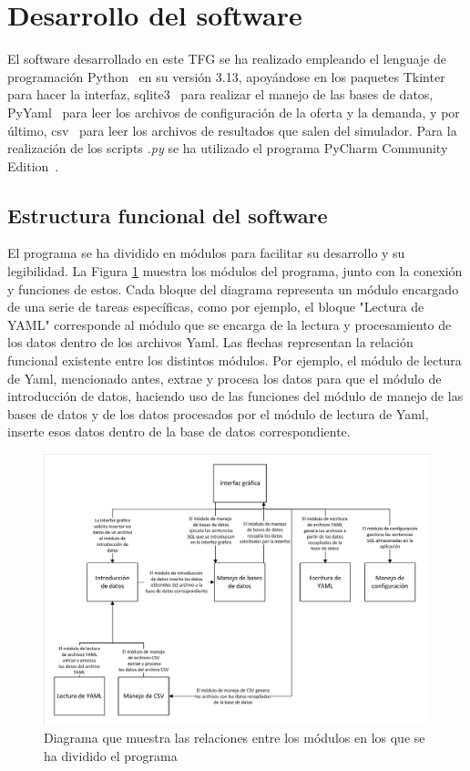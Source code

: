 \section{Desarrollo del software}
\label{sec:desarrolloSoftware}

El software desarrollado en este \acrshort{TFG} se ha realizado empleando el lenguaje de programación Python~\cite{Python} en su versión 3.13, apoyándose en los paquetes Tkinter~\cite{Tkinter} para hacer la interfaz, sqlite3~\cite{Python_SQLite3} para realizar el manejo de las bases de datos, PyYaml~\cite{PyYaml} para leer los archivos de configuración de la oferta y la demanda, y por último, csv~\cite{Python_CSV} para leer los archivos de resultados que salen del simulador. Para la realización de los scripts \textit{.py} se ha utilizado el programa PyCharm Community Edition~\cite{PyCharm}.

\subsection{Estructura funcional del software}

El programa se ha dividido en módulos para facilitar su desarrollo y su legibilidad. La Figura \ref{fig:DiagramaModulosPrograma} muestra los módulos del programa, junto con la conexión y funciones de estos. Cada bloque del diagrama representa un módulo encargado de una serie de tareas específicas, como por ejemplo, el bloque "Lectura de YAML" corresponde al módulo que se encarga de la lectura y procesamiento de los datos dentro de los archivos \acrshort{Yaml}. Las flechas representan la relación funcional existente entre los distintos módulos. Por ejemplo, el módulo de lectura de \acrshort{Yaml}, mencionado antes, extrae y procesa los datos para que el módulo de introducción de datos, haciendo uso de las funciones del módulo de manejo de las bases de datos y de los datos procesados por el módulo de lectura de \acrshort{Yaml}, inserte esos datos dentro de la base de datos correspondiente.

\begin{figure}[H]
\centering
\includegraphics[width=1\textwidth]{fig/Diagramas/Modulos de programa.pdf}
\caption{Diagrama que muestra las relaciones entre los módulos en los que se ha dividido el programa}
\label{fig:DiagramaModulosPrograma}
\end{figure}

